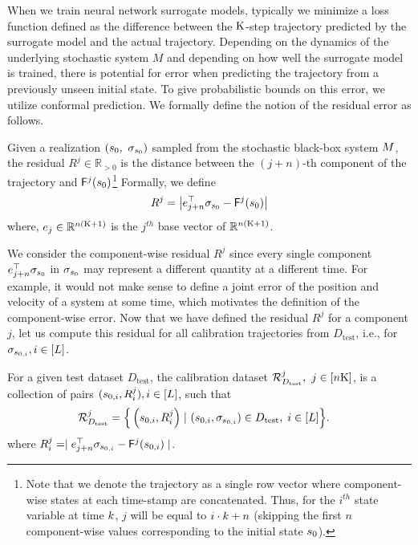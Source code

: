 When we train neural network surrogate models, typically we minimize a loss function defined as the difference between the $\mathrm{K}$-step trajectory predicted by the surrogate model and the actual trajectory. Depending on the dynamics of the underlying stochastic system $M$ and depending on how well the surrogate model is trained,
there is potential for error when predicting the trajectory from a previously unseen initial state. To give probabilistic bounds on this error, we 
utilize conformal prediction. We formally define the notion of the residual error as follows. 
\begin{definition}\label{def:residual} 
Given a realization $(\state_0,\ \traj_{\state_0})$  sampled from the stochastic black-box system $M$, the residual $R^j \in \mathbb{R}_{>0}$ is the distance between the $(j+n)$-th component of the trajectory and $\mathsf{F}^j(s_0)$\footnote{Note that we denote the trajectory as a single row vector where component-wise states at each time-stamp are concatenated. Thus, for the $i^{th}$ state variable at time $k$, $j$ will
be equal to $i\cdot k + n$ (skipping the first $n$ component-wise values corresponding to the initial state $s_0$).} Formally, we define
\[
R^j = \left|e_{j+n}^\top \sigma_{s_0} - \mathsf{F}^j(s_0)\right|
\]
where, $e_j \in \mathbb{R}^{n(\mathrm{K}+1)}$ is the $j^{th}$ base vector of $\mathbb{R}^{n(\mathrm{K}+1)}$.
\end{definition}
We consider the component-wise residual $R^j$ since every single component $e_{j+n}^\top \sigma_{s_0}$ in $\sigma_{s_0}$ may represent a different quantity at a different time. For example, it would not make sense to define a joint error of the position and velocity of a system at some time, which motivates the definition of the component-wise error. 
Now that we have defined the residual $R^j$ for a component $j$, let us compute this residual for all calibration trajectories from $D_{\text{test}}$, i.e., for $\sigma_{s_{0,i}}, i \in [L]$.

\begin{definition} 
For a given test dataset $D_{\text{test}}$, the calibration dataset $\mathcal{R}_{D_{\text{test}}}^{j},\ j \in [n\mathrm{K}]$, is a collection of pairs $(s_{0,i}, R^j_{i}), i\in[L]$, such that
$$
\begin{aligned}
\mathcal{R}_{D_{\text{test}}}^{j} = \Big\{ \left( s_{0,i}, R^j_i \right) \mid \ &  (s_{0,i}, \sigma_{s_{0,i}}) \in D_{\text{test}}, \; i\in [L] \Big\}.
\end{aligned}
$$
where $R^j_i = \mid e_{j+n}^\top \sigma_{s_{0,i}} - \mathsf{F}^j(s_{0,i})\mid $.
\end{definition}

